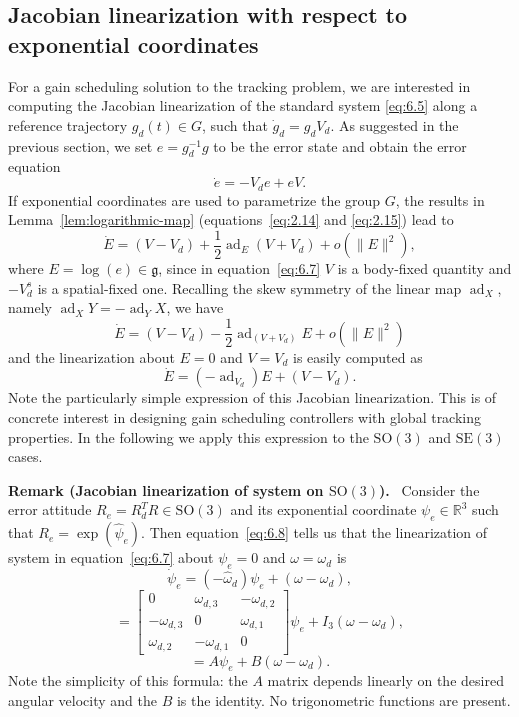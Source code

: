 \documentclass[11pt]{article}
\newcommand{\SO}{\mathrm{SO}}
\newcommand{\SE}{\mathrm{SE}}
\newcommand{\gfrak}{\mathfrak g}
\newcommand{\ad}{\operatorname{ad}}
\newcommand{\R}{\mathbb R}
\newcounter{paperremark}
\renewcommand{\thepaperremark}{\arabic{paperremark}}
\newcommand{\paperremark}[2]{\refstepcounter{paperremark}\par\medskip\noindent\textbf{Remark \thepaperremark#1.}\label{#2}\ }
\begin{document}
\subsection{Jacobian linearization with respect to exponential coordinates}\label{subsec:jacobian-linearization}
For a gain scheduling solution to the tracking problem, we are interested in computing the Jacobian linearization of the standard system \eqref{eq:6.5} along a reference trajectory $g_d(t)\in G$, such that $\dot g_d=g_dV_d$. As suggested in the previous section, we set $e=g_d^{-1}g$ to be the error state and obtain the error equation
\begin{equation*}
\dot e=-V_de+eV.\tag{6.7}\label{eq:6.7}
\end{equation*}
If exponential coordinates are used to parametrize the group $G$, the results in Lemma~\ref{lem:logarithmic-map} (equations~\eqref{eq:2.14} and \eqref{eq:2.15}) lead to
\begin{equation*}
\dot E=(V-V_d)+\frac12\ad_E(V+V_d)+o(\|E\|^2),
\end{equation*}
where $E=\log(e)\in\gfrak$, since in equation~\eqref{eq:6.7} $V$ is a body-fixed quantity and $-V_d^s$ is a spatial-fixed one. Recalling the skew symmetry of the linear map $\ad_X$, namely $\ad_XY=-\ad_YX$, we have
\begin{equation*}
\dot E=(V-V_d)-\frac12\ad_{(V+V_d)}E+o(\|E\|^2)
\end{equation*}
and the linearization about $E=0$ and $V=V_d$ is easily computed as
\begin{equation*}
\dot E=(-\ad_{V_d})E+(V-V_d).\tag{6.8}\label{eq:6.8}
\end{equation*}
Note the particularly simple expression of this Jacobian linearization. This is of concrete interest in designing gain scheduling controllers with global tracking properties. In the following we apply this expression to the $\SO(3)$ and $\SE(3)$ cases.

\paperremark{ (Jacobian linearization of system on $\SO(3)$)}{rem:jacobian-so3} Consider the error attitude $R_e=R_d^TR\in\SO(3)$ and its exponential coordinate $\psi_e\in\R^3$ such that $R_e=\exp(\widehat\psi_e)$. Then equation~\eqref{eq:6.8} tells us that the linearization of system in equation~\eqref{eq:6.7} about $\psi_e=0$ and $\omega=\omega_d$ is
\begin{equation*}
\dot\psi_e=(-\widehat\omega_d)\psi_e+(\omega-\omega_d),\tag{6.9}\label{eq:6.9}
\end{equation*}
\begin{equation*}
=\begin{bmatrix}0&\omega_{d,3}&-\omega_{d,2}\\-\omega_{d,3}&0&\omega_{d,1}\\\omega_{d,2}&-\omega_{d,1}&0\end{bmatrix}\psi_e+I_3(\omega-\omega_d),\tag{6.10}\label{eq:6.10}
\end{equation*}
\begin{equation*}
=A\psi_e+B(\omega-\omega_d).
\end{equation*}
Note the simplicity of this formula: the $A$ matrix depends linearly on the desired angular velocity and the $B$ is the identity. No trigonometric functions are present.
\end{document}
